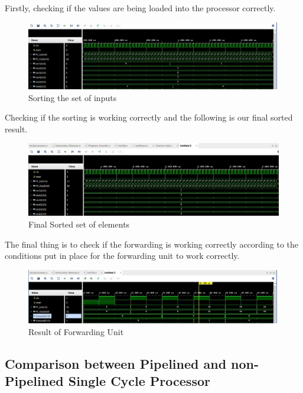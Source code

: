 \documentclass{article}
\begin{document}
Firstly, checking if the values are being loaded into the processor correctly. 

\begin{figure}[h]
    \centering
    \includegraphics*[width = 13 cm]{firstsorting.jpeg}
    \caption{Sorting the set of inputs}
    \label{fig: label 2}
\end{figure}

Checking if the sorting is working correctly and the following is our final sorted result. 

\begin{figure}[h]
    \centering
    \includegraphics*[width = 13 cm]{final_sorted.jpeg}
    \caption{Final Sorted set of elements}
    \label{fig: label 3}
\end{figure}

\newpage

The final thing is to check if the forwarding is working correctly according to the conditions put in place for the forwarding unit to work correctly.

\begin{figure}[h]
    \centering
    \includegraphics*[width = 13 cm]{forwarding.jpeg}
    \caption{Result of Forwarding Unit}
    \label{fig: label 4}
\end{figure}

\subsection{Comparison between Pipelined and non-Pipelined Single Cycle Processor}
\end{document}
